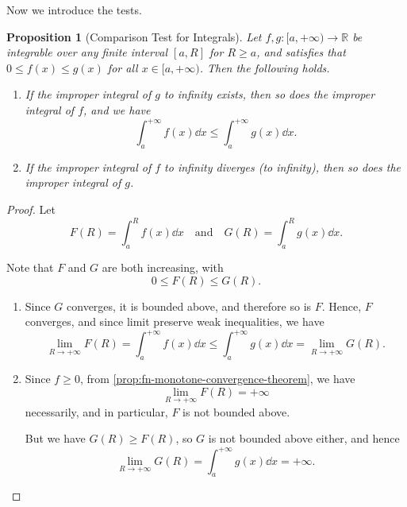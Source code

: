 \documentclass[11pt]{article}
\numberwithin{equation}{section}
\newtheorem{proposition}[theorem]{Proposition}
\theoremstyle{definition}
\theoremstyle{remark}
\newcommand{\pqty}[1]{\left(#1\right)}
\newcommand{\ccintv}[2]{[#1,#2]}
\newcommand{\cointv}[2]{[#1,#2)}
\newcommand{\functiondomain}[3]{#1:#2\to #3}
\newcommand{\RR}{\mathbb R}
\newcommand{\plusinfty}{+\infty}
\newcommand{\qand}{\quad\text{and}\quad}
\begin{document}
Now we introduce the tests.

\begin{proposition}[Comparison Test for Integrals]\label{analysis-unit-0184}
    \label{prop:int-test-comparison}%
    Let \(\functiondomain{f, g}{\cointv{a}{\plusinfty}}{\RR}\) be integrable over any finite interval \(\ccintv{a}{R}\) for \(R \geq a\), and satisfies that \(0 \leq f\pqty{x} \leq g\pqty{x}\) for all \(x \in \cointv{a}{\plusinfty}\). Then the following holds.

    \begin{enumerate}
        \item If the improper integral of \(g\) to infinity exists, then so does the improper integral of \(f\), and we have
        \[
            \int_{a}^{\plusinfty} f\pqty{x} \dd{x} \leq \int_{a}^{\plusinfty} g\pqty{x} \dd{x}.
        \]

        \item If the improper integral of \(f\) to infinity diverges (to infinity), then so does the improper integral of \(g\).
    \end{enumerate}
\end{proposition}

\begin{proof}
    Let
    \[
        F\pqty{R} = \int_{a}^{R} f\pqty{x} \dd{x} \qand G\pqty{R} = \int_{a}^{R} g\pqty{x} \dd{x}.
    \]

    Note that \(F\) and \(G\) are both increasing, with
    \[
        0 \leq F\pqty{R} \leq G\pqty{R}.
    \]

    \begin{enumerate}
        \item Since \(G\) converges, it is bounded above, and therefore so is \(F\). Hence, \(F\) converges, and since limit preserve weak inequalities, we have
        \[
            \lim_{R \to \plusinfty} F\pqty{R} = \int_{a}^{\plusinfty} f\pqty{x} \dd{x} \leq \int_{a}^{\plusinfty} g\pqty{x} \dd{x} = \lim_{R \to \plusinfty} G\pqty{R}.
        \]
        

        \item Since \(f \geq 0\), from \autoref{prop:fn-monotone-convergence-theorem}, we have
        \[
            \lim_{R \to \plusinfty} F\pqty{R} = \plusinfty
        \]
        necessarily, and in particular, \(F\) is not bounded above.

        But we have \(G\pqty{R} \geq F\pqty{R}\), so \(G\) is not bounded above either, and hence
        \[
            \lim_{R \to \plusinfty} G\pqty{R} = \int_{a}^{\plusinfty} g\pqty{x} \dd{x} = \plusinfty.
        \]
    \end{enumerate}
\end{proof}
\end{document}
